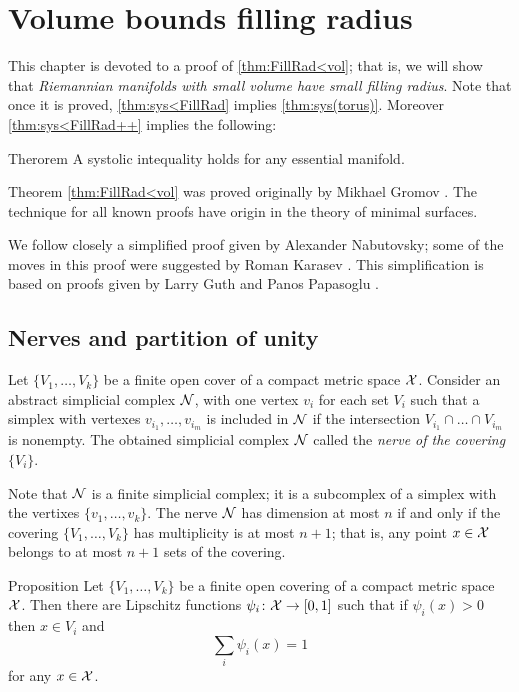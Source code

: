 \chapter{Volume bounds filling radius}

This chapter 
is devoted to a proof of \ref{thm:FillRad<vol};
that is, we will show that \emph{Riemannian manifolds with small volume have small filling radius}.
Note that once it is proved, \ref{thm:sys<FillRad} implies \ref{thm:sys(torus)}.
Moreover \ref{thm:sys<FillRad++} implies the following:

\begin{thm}{Therorem}\label{thm:sys(torus)+}
A systolic intequality holds for any essential manifold. 
\end{thm}

Theorem \ref{thm:FillRad<vol} was proved originally by Mikhael Gromov \cite{gromov-1983}.
The technique for all known proofs have origin in the theory of minimal surfaces.

We follow closely a simplified proof given by Alexander Nabutovsky; some of the moves in this proof were suggested by Roman Karasev \cite{nabutovsky}.
This simplification is based on proofs given by Larry Guth \cite{guth} and  Panos Papasoglu \cite{papasoglu}.



\section{Nerves and partition of unity}

Let $\{V_1,\dots,V_k\}$ be a finite open cover of a compact metric space $\mathcal{X}$.
Consider an abstract simplicial complex $\mathcal{N}$, with one vertex $v_i$ for each set $V_i$ such that a simplex with vertexes $v_{i_1},\dots, v_{i_m}$ is included in $\mathcal{N}$ if 
the intersection $V_{i_1}\cap\dots\cap V_{i_m}$ is nonempty.
The obtained simplicial complex $\mathcal{N}$ called the \emph{nerve of the covering $\{V_i\}$}.

Note that $\mathcal{N}$ is a finite simplicial complex;
it is a subcomplex of a simplex with the vertixes $\{v_1,\dots,v_k\}$.
The nerve $\mathcal{N}$ has dimension at most $n$ if and only if the covering $\{V_1,\dots,V_k\}$ has multiplicity is at most $n+1$;
that is, any point $x\in\mathcal{X}$ belongs to
at most $n+1$ sets of the covering.

\begin{thm}{Proposition}\label{thm:part-unit}
 Let $\{V_1,\dots,V_k\}$ be a finite open covering of a compact metric space ${\mathcal{X}}$.
Then there are Lipschitz functions $\psi_i\:{\spc{X}}\z\to[0,1]$ such that
if $\psi_i(x)>0$ then $x\in V_i$ and
$$\sum_i\psi_i(x)=1$$
for any $x\in {\mathcal{X}}$.
\end{thm}

